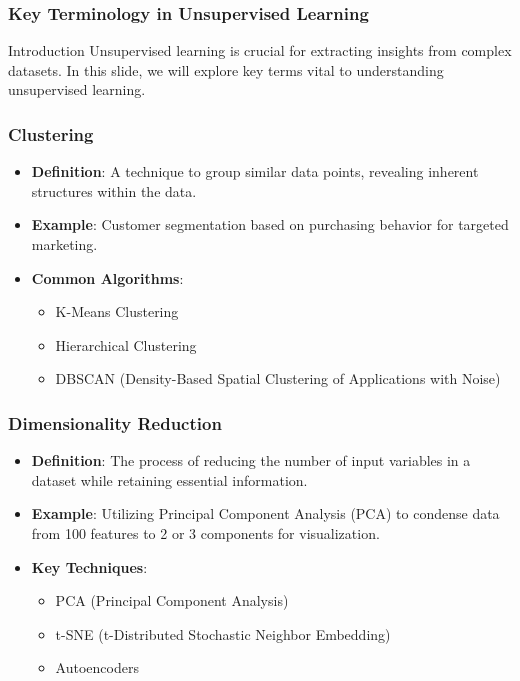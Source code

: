 \documentclass[aspectratio=169]{beamer}
\begin{document}
\begin{frame}[fragile]
    \frametitle{Key Terminology in Unsupervised Learning}
    \begin{block}{Introduction}
        Unsupervised learning is crucial for extracting insights from complex datasets. In this slide, we will explore key terms vital to understanding unsupervised learning.
    \end{block}
\end{frame}

\begin{frame}[fragile]
    \frametitle{Clustering}
    \begin{itemize}
        \item \textbf{Definition}: 
            A technique to group similar data points, revealing inherent structures within the data.
        \item \textbf{Example}: 
            Customer segmentation based on purchasing behavior for targeted marketing.
        \item \textbf{Common Algorithms}:
            \begin{itemize}
                \item K-Means Clustering
                \item Hierarchical Clustering
                \item DBSCAN (Density-Based Spatial Clustering of Applications with Noise)
            \end{itemize}
    \end{itemize}
\end{frame}

\begin{frame}[fragile]
    \frametitle{Dimensionality Reduction}
    \begin{itemize}
        \item \textbf{Definition}:
            The process of reducing the number of input variables in a dataset while retaining essential information.
        \item \textbf{Example}:
            Utilizing Principal Component Analysis (PCA) to condense data from 100 features to 2 or 3 components for visualization.
        \item \textbf{Key Techniques}:
            \begin{itemize}
                \item PCA (Principal Component Analysis)
                \item t-SNE (t-Distributed Stochastic Neighbor Embedding)
                \item Autoencoders
            \end{itemize}
    \end{itemize}
\end{frame}
\end{document}
